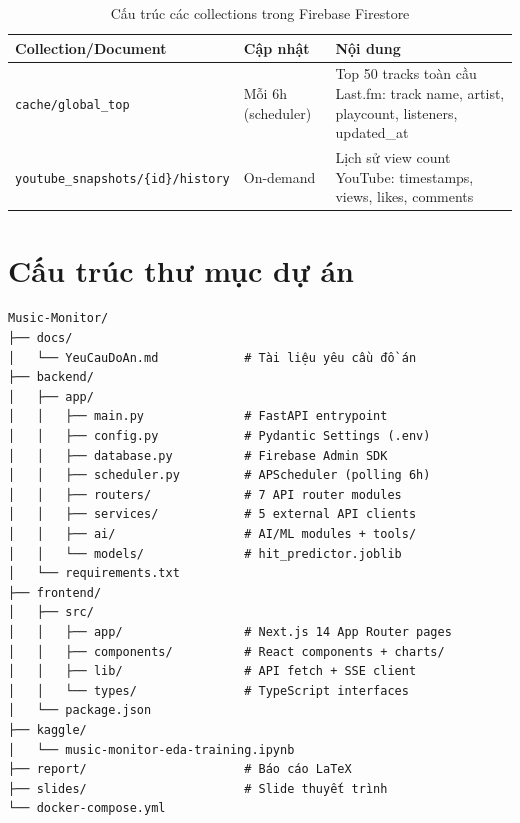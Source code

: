 \documentclass[12pt,a4paper]{report}
\begin{document}
\begin{table}[H]
\centering
\caption{Cấu trúc các collections trong Firebase Firestore}
\label{tab:firestore_schema}
\begin{tabularx}{\textwidth}{|l|l|X|}
\hline
\textbf{Collection/Document} & \textbf{Cập nhật} & \textbf{Nội dung} \\
\hline
\texttt{cache/global\_top} & Mỗi 6h (scheduler) & Top 50 tracks toàn cầu Last.fm: track name, artist, playcount, listeners, updated\_at \\
\hline
\texttt{youtube\_snapshots/\{id\}/history} & On-demand & Lịch sử view count YouTube: timestamps, views, likes, comments \\
\hline
\end{tabularx}
\end{table}

\section{Cấu trúc thư mục dự án}

\begin{verbatim}
Music-Monitor/
├── docs/
│   └── YeuCauDoAn.md            # Tài liệu yêu cầu đồ án
├── backend/
│   ├── app/
│   │   ├── main.py              # FastAPI entrypoint
│   │   ├── config.py            # Pydantic Settings (.env)
│   │   ├── database.py          # Firebase Admin SDK
│   │   ├── scheduler.py         # APScheduler (polling 6h)
│   │   ├── routers/             # 7 API router modules
│   │   ├── services/            # 5 external API clients
│   │   ├── ai/                  # AI/ML modules + tools/
│   │   └── models/              # hit_predictor.joblib
│   └── requirements.txt
├── frontend/
│   ├── src/
│   │   ├── app/                 # Next.js 14 App Router pages
│   │   ├── components/          # React components + charts/
│   │   ├── lib/                 # API fetch + SSE client
│   │   └── types/               # TypeScript interfaces
│   └── package.json
├── kaggle/
│   └── music-monitor-eda-training.ipynb
├── report/                      # Báo cáo LaTeX
├── slides/                      # Slide thuyết trình
└── docker-compose.yml
\end{verbatim}
\end{document}

